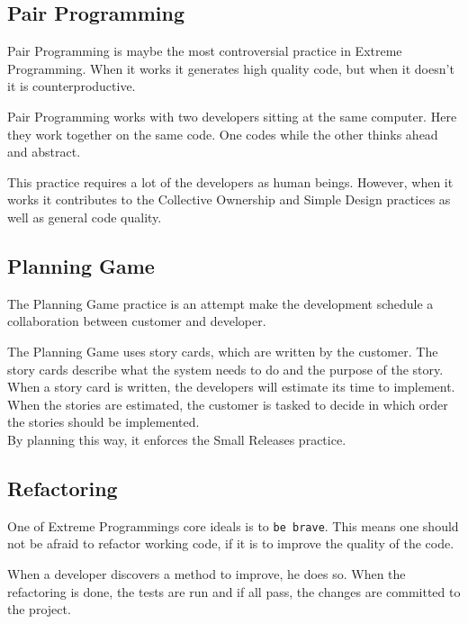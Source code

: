 

\subsection{Pair Programming}
Pair Programming is maybe the most controversial practice in Extreme Programming.
When it works it generates high quality code, but when it doesn't it is counterproductive.

Pair Programming works with two developers sitting at the same computer.
Here they work together on the same code.
One codes while the other thinks ahead and abstract.


This practice requires a lot of the developers as human beings.
However, when it works it contributes to the Collective Ownership and Simple Design practices as well as general code quality.

\subsection{Planning Game}
The Planning Game practice is an attempt make the development schedule a collaboration between customer and developer.


The Planning Game uses story cards, which are written by the customer.
The story cards describe what the system needs to do and the purpose of the story.
When a story card is written, the developers will estimate its time to implement.
When the stories are estimated, the customer is tasked to decide in which order the stories should be implemented.\\

By planning this way, it enforces the Small Releases practice.

\subsection{Refactoring}
One of Extreme Programmings core ideals is to \texttt{be brave}.
This means one should not be afraid to refactor working code, if it is to improve the quality of the code.

When a developer discovers a method to improve, he does so.
When the refactoring is done, the tests are run and if all pass, the changes are committed to the project.






